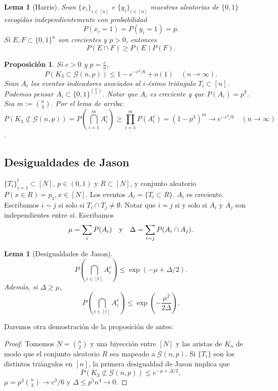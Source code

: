 \documentclass[12pt]{report}
\theoremstyle{plain}
\newtheorem{lemma}[theorem]{Lema}
\newtheorem{proposition}[theorem]{Proposición}
\theoremstyle{definition}
\begin{document}
\begin{lemma}[Harris]
Sean $\{x_i\}_{i \in [n]}$ e $\{y_i\}_{i \in [n]}$ \textit{muestras aleatorias} de $\{0,1\}$ escogidas independientemente con probabilidad
\[
P (x_i = 1) = P (y_i = 1) = p.
\]
Si $E, F \subset \{0,1\}^n$ son crecientes y $p > 0$, entonces
\[
P(E \cap F) \geq P(E) P(F).
\]
\end{lemma}

\begin{proposition}
Si $c > 0$ y $p = \frac c n$,
\[
P (K_3 \subset \mathcal G (n, p)) \leq 1 - e^{- c^3/6} + o(1) \quad (n \to \infty).
\]
Sean $A_i$ los eventos indicadores asociados al $i$-ésimo triángulo $T_i \subset [n]$. Podemos pensar $A_i \subset \{0,1\}^{\binom n 2}$. Notar que $A_i$ es creciente y que $P (A_i) = p^3$. Sea $m := \binom n 3$. Por el lema de arriba:
\[
P(K_3 \not \subset \mathcal G (n,p)) = P (\bigcap_{i = 1}^m A_i^c) \geq \prod_{i = 1}^m P(A_i^c) = (1- p^3)^m \longrightarrow e^{-c^3 / 6} \quad (n \to \infty)
\].
\end{proposition}

\subsection{Desigualdades de Jason}

$\{ T_i\}_{i = 1}^t \subset [N]$, $p \in (0,1)$ y $R \subset [N]$, y conjunto aleatorio $P( x \in R) = p_1 , x \in [N]$. Los eventos $A_i = \{T_i \subset R\}$. $A_i$ es creciente. Escribamos $i \sim j$ si solo si $T_i \cap T_j \neq \emptyset$. Notar que $i \not \sim j$ si y solo si $A_i$ y $A_j$ son independientes entre sí. Escribamos
\[
\mu = \sum_i P(A_i) \quad \text y \quad \Delta = \sum_{i \sim j} P (A_i \cap A_j).
\]

\begin{lemma}[Desigualdades de Jason]
\[
    P (\bigcap_{i \in [t]} A_i^c) \leq \exp (- \mu + \Delta / 2).
\]
Además, si $\Delta \geq \mu$,
\[
P (\bigcap_{ i \in [t]} A_i^c) \leq \exp ( - \frac{\mu^2}{2 \Delta}).
\]
\end{lemma}

Daremos otra demostración de la proposición de antes:

\begin{proof}
    Tomemos $N = \binom n 2$ y una biyección entre $[N]$ y las aristas de $K_n$ de modo que el conjunto aleatorio $R$ sea mapeado a $\mathcal G (n, p)$. Si $\{T_i\}$ son los distintos triángulos en $[n]$, la primera desigualdad de Jason implica que
    \[
        P (K_3 \not \subset \mathcal G (n, p)) \leq e^{- \mu + \Delta / 2},
    \]
    $\mu = p^3 \binom n 3 \to c^3 / 6$ y $\Delta \leq p^5 n^4 \to 0$.
\end{proof}
\end{document}
